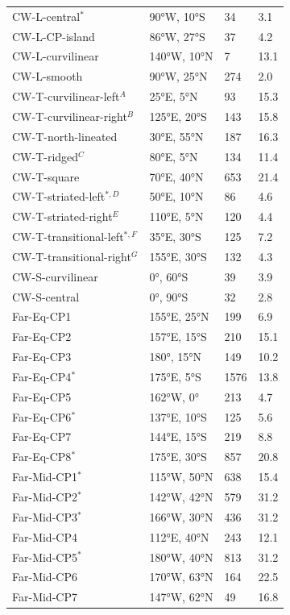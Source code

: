 \documentclass[preprint,11pt,3p,times,authoryear]{elsarticle}
\begin{document}
\begin{longtable}{p{4.0cm} p{3.0cm} p{2.0cm} p{3.0cm}}
CW-L-central$^{*}$ & 90°W, 10°S & 34 & 3.1 \\
CW-L-CP-island & 86°W, 27°S  & 37 & 4.2 \\
CW-L-curvilinear &  140°W, 10°N & 7 &  13.1 \\
CW-L-smooth &  90°W, 25°N & 274 &  2.0 \\
CW-T-curvilinear-left$^{A}$ & 25°E, 5°N & 93 &  15.3\\
CW-T-curvilinear-right$^{B}$ & 125°E, 20°S & 143 &  15.8\\
CW-T-north-lineated & 30°E, 55°N & 187 &  16.3\\
CW-T-ridged$^{C}$ & 80°E, 5°N & 134 &  11.4 \\
CW-T-square & 70°E, 40°N & 653 &  21.4 \\
CW-T-striated-left$^{*,D}$ & 50°E, 10°N & 86 & 4.6 \\
CW-T-striated-right$^{E}$ & 110°E, 5°N & 120 & 4.4 \\
CW-T-transitional-left$^{*,F}$ & 35°E, 30°S & 125 & 7.2 \\
CW-T-transitional-right$^{G}$ & 155°E, 30°S & 132 &  4.3 \\
CW-S-curvilinear & 0°, 60°S & 39 &  3.9 \\
CW-S-central & 0°, 90°S & 32 &  2.8 \\
Far-Eq-CP1 & 155°E, 25°N & 199 &  6.9 \\
Far-Eq-CP2 & 157°E, 15°S & 210 &  15.1 \\
Far-Eq-CP3 & 180°, 15°N & 149 &  10.2\\
Far-Eq-CP4$^{*}$ & 175°E, 5°S & 1576 & 13.8 \\
Far-Eq-CP5 & 162°W, 0° & 213 &  4.7 \\
Far-Eq-CP6$^{*}$ & 137°E, 10°S & 125 & 5.6 \\
Far-Eq-CP7 & 144°E, 15°S & 219 &  8.8 \\
Far-Eq-CP8$^{*}$ & 175°E, 30°S & 857 & 20.8\\
Far-Mid-CP1$^{*}$ & 115°W, 50°N & 638 & 15.4 \\
Far-Mid-CP2$^{*}$ & 142°W, 42°N & 579 & 31.2 \\
Far-Mid-CP3$^{*}$ & 166°W, 30°N & 436 & 31.2\\
Far-Mid-CP4 & 112°E, 40°N & 243 &  12.1\\
Far-Mid-CP5$^{*}$ & 180°W, 40°N & 813 & 31.2\\
Far-Mid-CP6 & 170°W, 63°N & 164 &  22.5\\
Far-Mid-CP7 & 147°W, 62°N & 49 &  16.8\\

\end{longtable}
\end{document}
